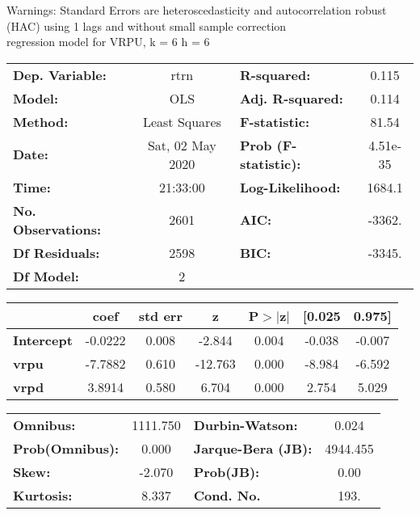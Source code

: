 Warnings: \newline
 [1] Standard Errors are heteroscedasticity and autocorrelation robust (HAC) using 1 lags and without small sample correction\\ 

regression model for VRPU, k = 6 h = 6\begin{center}
\begin{tabular}{lclc}
\toprule
\textbf{Dep. Variable:}    &       rtrn       & \textbf{  R-squared:         } &     0.115   \\
\textbf{Model:}            &       OLS        & \textbf{  Adj. R-squared:    } &     0.114   \\
\textbf{Method:}           &  Least Squares   & \textbf{  F-statistic:       } &     81.54   \\
\textbf{Date:}             & Sat, 02 May 2020 & \textbf{  Prob (F-statistic):} &  4.51e-35   \\
\textbf{Time:}             &     21:33:00     & \textbf{  Log-Likelihood:    } &    1684.1   \\
\textbf{No. Observations:} &        2601      & \textbf{  AIC:               } &    -3362.   \\
\textbf{Df Residuals:}     &        2598      & \textbf{  BIC:               } &    -3345.   \\
\textbf{Df Model:}         &           2      & \textbf{                     } &             \\
\bottomrule
\end{tabular}
\begin{tabular}{lcccccc}
                   & \textbf{coef} & \textbf{std err} & \textbf{z} & \textbf{P$> |$z$|$} & \textbf{[0.025} & \textbf{0.975]}  \\
\midrule
\textbf{Intercept} &      -0.0222  &        0.008     &    -2.844  &         0.004        &       -0.038    &       -0.007     \\
\textbf{vrpu}      &      -7.7882  &        0.610     &   -12.763  &         0.000        &       -8.984    &       -6.592     \\
\textbf{vrpd}      &       3.8914  &        0.580     &     6.704  &         0.000        &        2.754    &        5.029     \\
\bottomrule
\end{tabular}
\begin{tabular}{lclc}
\textbf{Omnibus:}       & 1111.750 & \textbf{  Durbin-Watson:     } &    0.024  \\
\textbf{Prob(Omnibus):} &   0.000  & \textbf{  Jarque-Bera (JB):  } & 4944.455  \\
\textbf{Skew:}          &  -2.070  & \textbf{  Prob(JB):          } &     0.00  \\
\textbf{Kurtosis:}      &   8.337  & \textbf{  Cond. No.          } &     193.  \\
\bottomrule
\end{tabular}
\end{center}

